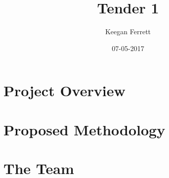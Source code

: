 \documentclass{article}
\title{Tender 1}
\date{07-05-2017}
\author{Keegan Ferrett}
\begin{document}
	\maketitle
	\newpage

	\tableofcontents
	\newpage

	\section{Project Overview}


	\newpage
	\section{Proposed Methodology}
	
	\newpage
	\section{The Team}
	

\end{document}
